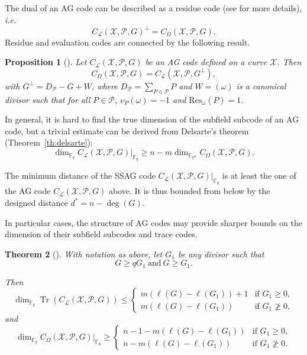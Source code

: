 \documentclass[a4paper]{amsart}
\newtheorem{thm}{Theorem}[section]
\newtheorem{proposition}[thm]{Proposition}
\theoremstyle{definition}
\theoremstyle{remark}
\DeclareMathOperator{\trace}{Tr}
\newcommand{\calP}{\mathcal{P}}
\newcommand{\calL}{\mathcal{L}}
\newcommand{\calX}{\mathcal{X}}
\newcommand{\fqm}{\mathbb{F}_{q^m}}
\newcommand{\fq}{\mathbb{F}_{q}}
\newcommand{\Tr}[1]{\trace\!\left(#1\right)}
\newcommand{\ssag}[1]{\operatorname{\mathsf{SSAG}}_{q}\left(#1\right)}
\begin{document}
The dual of an AG code can be described as a residue code (see \cite{Sti09} for more details), \emph{i.e.}
$$ C_{\calL}(\calX,\calP,G)^{\perp} = C_{\Omega}(\calX,\calP,G).$$ 
Residue and evaluation codes are connected by the following result.

\begin{proposition} [{\cite[Proposition~2.2.10]{Sti09}}] \label{prop:dual_AG_codes}
Let $C_{\calL}(\calX,\calP,G)$ be an AG code defined on a curve $\calX$. Then 
\[C_{\Omega}(\calX,\calP,G) = C_{\calL}(\calX,\calP,G^{\perp}),\]
with $G^{\perp} = D_{\calP}-G+W$, where $D_{\calP} = \sum\limits_{P \in \calP} P$ and $W=(\omega)$ is a canonical divisor such that for all $P \in \calP$, $\nu_P(\omega)=-1$ and $\mathrm{Res}_{\omega}(P)=1$. 
\end{proposition}


In general, it is hard to find the true dimension of the subfield subcode of an AG code, but a trivial estimate can be derived from Delsarte's theorem (Theorem~\ref{th:delsarte}):
\begin{equation}\label{eq:dim_ssag}
	\dim_{\fq} C_{\calL}(\calX,\calP,G)|_{\fq} \geq n - m\dim_{\fqm} C_{\Omega}(\calX,\calP,G).
\end{equation}

The minimum distance of the SSAG code $C_{\calL}(\calX,\calP,G)|_{\fq}$ is at least the one of the AG code $C_{\calL}(\calX,\calP,G)$ above. It is thus bounded from below by the designed distance $d^*=n-\deg (G)$.%

In particular cases, the structure of AG codes may provide sharper bounds on the dimension of their subfield subcodes and trace codes.

\begin{thm}[{\cite[Theorem~9.1.6]{Sti09}}]\label{thm:dim_ssag}
	With notation as above, let $G_1$ be any divisor such that 
	\begin{equation} \label{eq:divisor_G_1}
		G \geq qG_1 \ \mathrm{and} \ G \geq G_1.
	\end{equation}

	Then
\[	\dim_{\fq} \Tr{C_{\calL}(\calX,\calP,G)} \leq  \left\{\begin{array}{ll}
	m\left(\ell(G) - \ell(G_1)\right)+1 & \text{if } G_1 \geq 0, \\
	m\left(\ell(G) - \ell(G_1)\right) & \text{if } G_1 \not\geq 0, 
\end{array} \right.\]	
	and	
\[	\dim_{\fq} C_{\Omega}(\calX,\calP,G)|_{\fq} \geq  \left\{\begin{array}{ll}
	n-1-m\left(\ell(G) - \ell(G_1)\right) & \text{if } G_1 \geq 0, \\
	n-m\left(\ell(G) - \ell(G_1)\right) & \text{if } G_1 \not\geq 0. 
\end{array} \right.\]
\end{thm}
\end{document}
